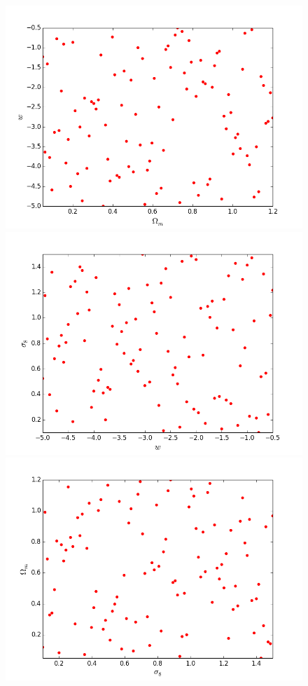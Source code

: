 \documentclass[11pt]{article}
\begin{document}
\begin{figure}
\begin{center}
\includegraphics[scale=0.25]{Figures/first_shuffle1.png}
\includegraphics[scale=0.25]{Figures/first_shuffle2.png}
\includegraphics[scale=0.25]{Figures/first_shuffle3.png}

\end{center}
\end{figure}
\end{document}
